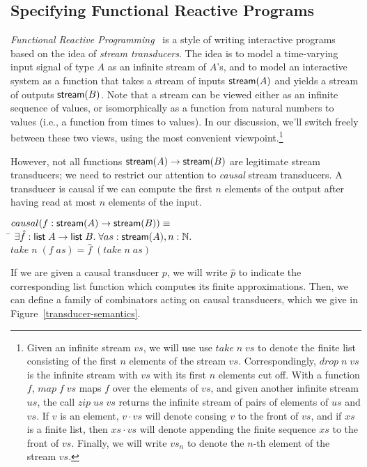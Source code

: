 \subsection{Specifying Functional Reactive Programs}

\emph{Functional Reactive Programming}~\cite{frp} is a style of
writing interactive programs based on the idea of \emph{stream
  transducers}.  The idea is to model a time-varying input signal of
type $A$ as an infinite stream of $A$'s, and to model an interactive
system as a function that takes a stream of inputs $\mathsf{stream}({A})$ and
yields a stream of outputs $\mathsf{stream}({B})$. Note that a stream can be
viewed either as an infinite sequence of values, or isomorphically as
a function from natural numbers to values (i.e., a function from times
to values). In our discussion, we'll switch freely between these two
views, using the most convenient viewpoint.\footnote{Given an infinite stream $vs$, we will use use $take\;n\;vs$ to denote
the finite list consisting of the first $n$ elements of the stream
$vs$. Correspondingly, $drop\;n\;vs$ is the infinite stream with $vs$
with its first $n$ elements cut off. With a function $f$, $map\;f\;vs$
maps $f$ over the elements of $vs$, and given another infinite stream
$us$, the call $zip\;us\;vs$ returns the infinite stream of pairs of
elements of $us$ and $vs$. If $v$ is an element, $v \cdot vs$ will 
denote consing $v$ to the front of $vs$, and if $xs$ is a finite list, then
$xs \cdot vs$ will denote appending the finite sequence $xs$ to the
front of $vs$. Finally, we will write $vs_n$ to denote the $n$-th element
of the stream $vs$.}

However, not all functions $\mathsf{stream}({A}) \to \mathsf{stream}({B})$ are legitimate
stream transducers; we need to restrict our attention to \emph{causal}
stream transducers. A transducer is causal if we can compute the first
$n$ elements of the output after having read at most $n$ elements of
the input. 

\begin{tabbing}
$causal(f : \mathsf{stream}({A}) \to \mathsf{stream}({B})) \equiv$ \\
\;\;\= $\exists \hat{f} : \mathsf{list}\;{A} \to \mathsf{list}\;{B}.\;\forall as:\mathsf{stream}({A}), n:\mathbb{N}.$ \\
    \> \;\;$take\;n\;(f\;as) = \hat{f}\;(take\;n\;as)$ 
\end{tabbing}

If we are given a causal transducer $p$, we will write $\hat{p}$ to
indicate the corresponding list function which computes its finite
approximations. Then, we can define a family of combinators acting on
causal transducers, which we give in Figure~\ref{transducer-semantics}.

